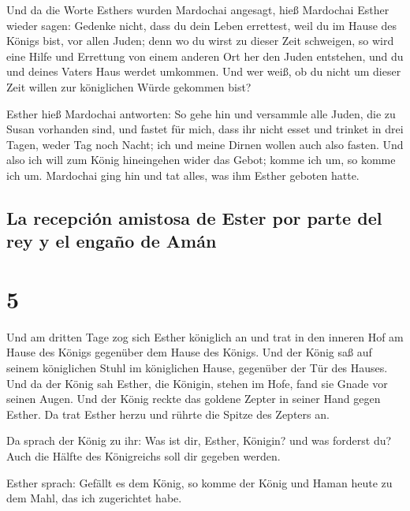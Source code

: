  Und da die Worte Esthers wurden Mardochai angesagt,
 hieß Mardochai Esther wieder sagen: Gedenke nicht, dass
du dein Leben errettest, weil du im Hause des Königs bist, vor allen
Juden;  denn wo du wirst zu dieser Zeit schweigen, so
wird eine Hilfe und Errettung von einem anderen Ort her den Juden
entstehen, und du und deines Vaters Haus werdet umkommen. Und wer weiß,
ob du nicht um dieser Zeit willen zur königlichen Würde gekommen bist?

 Esther hieß Mardochai antworten:  So gehe
hin und versammle alle Juden, die zu Susan vorhanden sind, und fastet
für mich, dass ihr nicht esset und trinket in drei Tagen, weder Tag noch
Nacht; ich und meine Dirnen wollen auch also fasten. Und also ich will
zum König hineingehen wider das Gebot; komme ich um, so komme ich um.
 Mardochai ging hin und tat alles, was ihm Esther geboten
hatte.

\hypertarget{la-recepciuxf3n-amistosa-de-ester-por-parte-del-rey-y-el-engauxf1o-de-amuxe1n}{%
\subsection{La recepción amistosa de Ester por parte del rey y el engaño
de
Amán}\label{la-recepciuxf3n-amistosa-de-ester-por-parte-del-rey-y-el-engauxf1o-de-amuxe1n}}

\hypertarget{section-4}{%
\section{5}\label{section-4}}

 Und am dritten Tage zog sich Esther königlich an und trat
in den inneren Hof am Hause des Königs gegenüber dem Hause des Königs.
Und der König saß auf seinem königlichen Stuhl im königlichen Hause,
gegenüber der Tür des Hauses.  Und da der König sah
Esther, die Königin, stehen im Hofe, fand sie Gnade vor seinen Augen.
Und der König reckte das goldene Zepter in seiner Hand gegen Esther. Da
trat Esther herzu und rührte die Spitze des Zepters an.

 Da sprach der König zu ihr: Was ist dir, Esther, Königin?
und was forderst du? Auch die Hälfte des Königreichs soll dir gegeben
werden.

 Esther sprach: Gefällt es dem König, so komme der König
und Haman heute zu dem Mahl, das ich zugerichtet habe.

